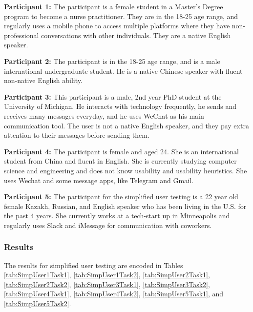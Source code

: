 \documentclass[acmsmall,screen,authorversion,nonacm]{acmart}
\begin{document}
\textbf{Participant 1:} The participant is a female student in a Master's Degree program to become a nurse practitioner. They are in the 18-25 age range, and regularly uses a mobile phone to access multiple platforms where they have non-professional conversations with other individuals. They are a native English speaker.

\textbf{Participant 2:} The participant is in the 18-25 age range, and is a male international undergraduate student. He is a native Chinese speaker with fluent non-native English ability.

\textbf{Participant 3:}
This participant is a male, 2nd year PhD student at the University of Michigan. He interacts with technology frequently, he sends and receives many messages everyday, and he uses WeChat as his main communication tool. The user is not a native English speaker, and they pay extra attention to their messages before sending them. 

\textbf{Participant 4:} %
The participant is female and aged 24. She is an international student from China and fluent in English. She is currently studying computer science and engineering and does not know usability and usability heuristics. She uses Wechat and some message apps, like Telegram and Gmail. 

\textbf{Participant 5:} %
The participant for the simplified user testing is a 22 year old female Kazakh, Russian, and English speaker who has been living in the U.S. for the past 4 years. She currently works at a tech-start up in Minneapolis and regularly uses Slack and iMessage for communication with coworkers.

\subsubsection{Results}

The results for simplified user testing are encoded in Tables \ref{tab:SimpUser1Task1}, \ref{tab:SimpUser1Task2}, \ref{tab:SimpUser2Task1}, \ref{tab:SimpUser2Task2}, \ref{tab:SimpUser3Task1}, \ref{tab:SimpUser3Task2}, \ref{tab:SimpUser4Task1}, \ref{tab:SimpUser4Task2}, \ref{tab:SimpUser5Task1}, and \ref{tab:SimpUser5Task2}.
\end{document}
